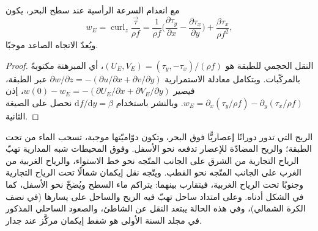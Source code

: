 \begin{proposition}[ضخّ إيكمان]\label{prop:b3:ocean-dynamics:pumping}
مع انعدام السرعة الرأسية عند سطح البحر، يكون 
\[
w_E = \operatorname{curl}_z\frac{\vec\tau}{\rho f}
= \frac{1}{\rho f}\Big(\frac{\partial\tau_y}{\partial x} -
\frac{\partial\tau_x}{\partial y}\Big) + \frac{\beta\tau_x}{\rho f^2} ,
\]
ويُعدّ الاتجاه الصاعد موجبًا.
\end{proposition}

\begin{proof}
النقل الحجمي للطبقة هو $(U_E, V_E) = (\tau_y,
-\tau_x)/(\rho f)$، أي المبرهنة مكتوبةً بالمركّبات. وبتكامل
معادلة الاستمرارية $\partial w/\partial z = -(\partial u/\partial x +
\partial v/\partial y)$ عبر الطبقة، فيصير $w(0) - w_E = -(\partial
U_E/\partial x + \partial V_E/\partial y)$، إذن $w_E = \partial_x(\tau_y/\rho
f) - \partial_y(\tau_x/\rho f)$. وبالنشر باستخدام $\mathrm df/\mathrm dy =
\beta$ نحصل على الصيغة الثانية.
\end{proof}

الريح التي تدور دورانًا إعصاريًّا فوق البحر، وتكون دوّاميّتها موجبة، تسحب
الماء من تحت الطبقة؛ والريح المضادّة للإعصار تدفعه نحو الأسفل. وفوق
المحيطات شبه المدارية تهبّ الرياح التجارية من الشرق على الجانب
المتّجه نحو خط الاستواء، والرياح الغربية من الغرب على الجانب المتّجه نحو القطب. ويتّجه نقل إيكمان
شمالًا تحت الرياح التجارية وجنوبًا تحت الرياح الغربية، فيتقارب
بينهما: يتراكم ماء السطح ويُضخّ نحو الأسفل، كما
في الشكل أدناه. وعلى امتداد ساحل تهبّ فيه الريح
والساحل على يسارها (في نصف الكرة الشمالي)، وفي هذه الحالة
يبتعد النقل عن الشاطئ، والصعود الساحلي المذكور في مجلد السنة الأولى
هو شفط إيكمان مركَّز عند جدار.

